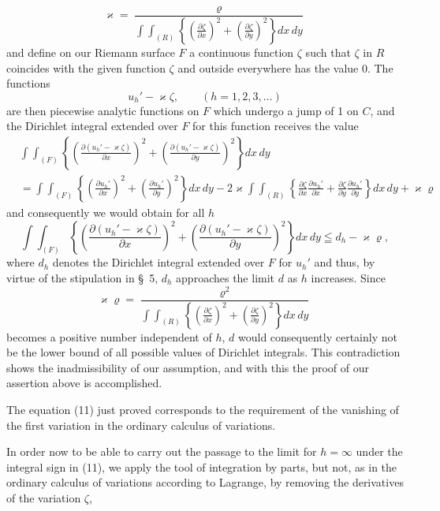 \documentclass{article}
\begin{document}
\[
\varkappa = \frac{\varrho}{\displaystyle\int\!\!\int_{(R)} \left\{ \left(\frac{\partial\zeta}{\partial x}\right)^2 + \left(\frac{\partial\zeta}{\partial y}\right)^2 \right\} dx\,dy}
\]
and define on our Riemann surface $F$ a continuous function $\zeta$ such that $\zeta$ in $R$ coincides with the given function $\zeta$ and outside everywhere has the value 0. The functions
\[
u_h' - \varkappa\zeta, \qquad (h = 1, 2, 3, \dots)
\]
are then piecewise analytic functions on $F$ which undergo a jump of 1 on $C$, and the Dirichlet integral extended over $F$ for this function receives the value
\[
\begin{aligned}
& \int\!\!\int_{(F)} \left\{ \left(\frac{\partial (u_h' - \varkappa\zeta)}{\partial x}\right)^2 + \left(\frac{\partial (u_h' - \varkappa\zeta)}{\partial y}\right)^2 \right\} dx\,dy \\
&= \int\!\!\int_{(F)} \left\{ \left(\frac{\partial u_h'}{\partial x}\right)^2 + \left(\frac{\partial u_h'}{\partial y}\right)^2 \right\} dx\,dy - 2\varkappa \int\!\!\int_{(R)} \left\{ \frac{\partial\zeta}{\partial x} \frac{\partial u_h'}{\partial x} + \frac{\partial\zeta}{\partial y} \frac{\partial u_h'}{\partial y} \right\} dx\,dy + \varkappa\varrho
\end{aligned}
\]
and consequently we would obtain for all $h$
\[
\int\!\!\int_{(F)} \left\{ \left(\frac{\partial (u_h' - \varkappa\zeta)}{\partial x}\right)^2 + \left(\frac{\partial (u_h' - \varkappa\zeta)}{\partial y}\right)^2 \right\} dx\,dy \leqq d_h - \varkappa\varrho,
\]
where $d_h$ denotes the Dirichlet integral extended over $F$ for $u_h'$ and thus, by virtue of the stipulation in §~5, $d_h$ approaches the limit $d$ as $h$ increases. Since
\[
\varkappa\varrho = \frac{\varrho^2}{\displaystyle\int\!\!\int_{(R)} \left\{ \left(\frac{\partial\zeta}{\partial x}\right)^2 + \left(\frac{\partial\zeta}{\partial y}\right)^2 \right\} dx\,dy}
\]
becomes a positive number independent of $h$, $d$ would consequently certainly not be the lower bound of all possible values of Dirichlet integrals. This contradiction shows the inadmissibility of our assumption, and with this the proof of our assertion above is accomplished.

The equation (11) just proved corresponds to the requirement of the vanishing of the first variation in the ordinary calculus of variations.

In order now to be able to carry out the passage to the limit for $h=\infty$ under the integral sign in (11), we apply the tool of integration by parts, but not, as in the ordinary calculus of variations according to Lagrange, by removing the derivatives of the variation $\zeta$,
\end{document}
